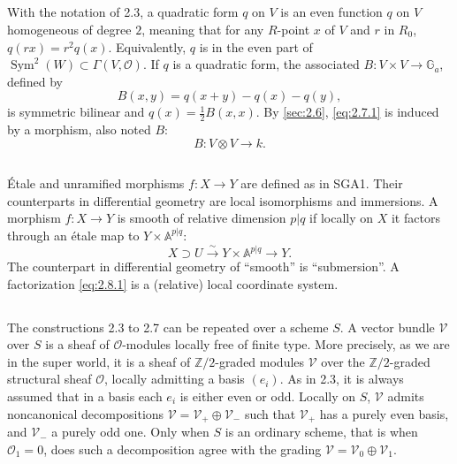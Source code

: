 \documentclass[11pt,a4paper]{article}
\theoremstyle{plain}
\theoremstyle{definition}
\DeclareMathOperator{\Sym}{Sym}
\newcommand{\Z}{\mathbb{Z}}
\begin{document}
\subsection{}
\label{sec:2.7}
With the notation of 2.3, a quadratic form $q$ on $V$ is an even function $q$ on $V$ homogeneous of degree $2$, meaning that for any $R$-point $x$ of $V$ and $r$ in $R_0$, $q(rx) = r^2 q(x)$. Equivalently, $q$ is in the even part of $\Sym^2(W) \subset \Gamma(V, \mathcal{O})$. If $q$ is a quadratic form, the associated $B: V \times V \to \mathbb{G}_a$, defined by
\begin{equation}\label{eq:2.7.1}
B(x,y) = q(x+y) - q(x) - q(y),
\end{equation}
is symmetric bilinear and $q(x) = \frac{1}{2} B(x,x)$. By \ref{sec:2.6}, \eqref{eq:2.7.1} is induced by a morphism, also noted $B$:
\begin{equation}\label{eq:2.7.2}
B : V \otimes V \to k.
\end{equation}

\subsection{}
\label{sec:2.8}
\'Etale and unramified morphisms $f : X \to Y$ are defined as in SGA1. Their counterparts in differential geometry are local isomorphisms and immersions. A morphism $f : X \to Y$ is smooth of relative dimension $p|q$ if locally on $X$ it factors through an \'etale map to $Y \times \mathbb{A}^{p|q}$:
\begin{equation}\label{eq:2.8.1}
X \supset U \xrightarrow{\sim} Y \times \mathbb{A}^{p|q} \to Y.
\end{equation}
The counterpart in differential geometry of ``smooth'' is ``submersion''. A factorization \eqref{eq:2.8.1} is a (relative) local coordinate system.

\subsection{}
The constructions 2.3 to 2.7 can be repeated over a scheme $S$. A vector bundle $\mathcal{V}$ over $S$ is a sheaf of $\mathcal{O}$-modules locally free of finite type. More precisely, as we are in the super world, it is a sheaf of $\Z/2$-graded modules $\mathcal{V}$ over the $\Z/2$-graded structural sheaf $\mathcal{O}$, locally admitting a basis $(e_i)$. As in 2.3, it is always assumed that in a basis each $e_i$ is either even or odd. Locally on $S$, $\mathcal{V}$ admits noncanonical decompositions $\mathcal{V} = \mathcal{V}_+ \oplus \mathcal{V}_-$ such that $\mathcal{V}_+$ has a purely even basis, and $\mathcal{V}_-$ a purely odd one. Only when $S$ is an ordinary scheme, that is when $\mathcal{O}_1 = 0$, does such a decomposition agree with the grading $\mathcal{V} = \mathcal{V}_0 \oplus \mathcal{V}_1$.
\end{document}
